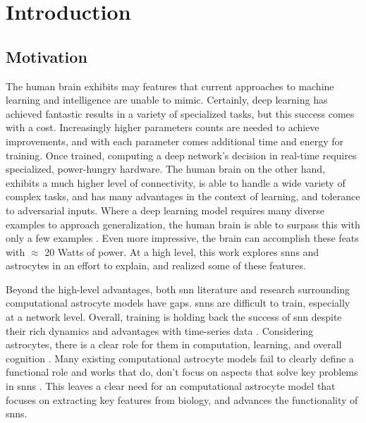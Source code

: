 %
%
%
%
%


\chapter{Introduction}\label{section:introduction}
\section{Motivation}

The human brain exhibits may features that current approaches to machine
learning and intelligence are unable to mimic. Certainly, deep learning has
achieved fantastic results in a variety of specialized tasks, but this success
comes with a cost. Increasingly higher parameters counts are needed to
achieve improvements, and with each parameter comes additional time and energy
for training. Once trained, computing a deep network's decision in real-time
requires specialized, power-hungry hardware. The human brain on the other hand,
exhibits a much higher level of connectivity, is able to handle a wide variety
of complex tasks, and has many advantages in the context of learning, and
tolerance to adversarial inputs. Where a deep learning model requires many
diverse examples to approach generalization, the human brain is able to
surpass this with only a few examples \cite{tsimenidis_2020}. Even more
impressive, the brain can accomplish these feats with $\approx$ 20 Watts of
power. At a high level, this work explores \glspl{snn} and astrocytes in an
effort to explain, and realized some of these features.

Beyond the high-level advantages, both \gls{snn} literature and research
surrounding computational astrocyte models have gaps. \glspl{snn} are difficult
to train, especially at a network level. Overall, training is holding back
the success of \gls{snn} despite their rich dynamics and advantages with
time-series data \cite{tavanaei_2019}. Considering astrocytes, there is a clear
role for them in computation, learning, and overall cognition
\cite{mederos_2018}. Many existing computational astrocyte models fail to clearly
define a functional role and works that do, don't focus on aspects that solve key
problems in \glspl{snn} \cite{manninen_2019}. This leaves a clear need for an
computational astrocyte model that focuses on extracting key features from
biology, and advances the functionality of \glspl{snn}.

